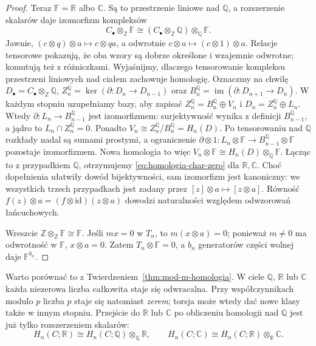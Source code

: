 \documentclass[11pt,a4paper,oneside]{report}
\newcommand{\R}{\mathbb{R}}
\newcommand{\C}{\mathbb{C}}
\newcommand{\Z}{\mathbb{Z}}
\newcommand{\Q}{\mathbb{Q}}
\newcommand{\id}{\mathrm{id}}
\theoremstyle{plain}
\theoremstyle{definition}
\theoremstyle{remark}
\begin{document}
\begin{proof}
Teraz $\mathbb F=\R$ albo $\C$.
Są to przestrzenie liniowe nad $\Q$, a
rozszerzenie skalarów daje izomorfizm
kompleksów
\[
 C_\bullet\otimes_{\Z}\mathbb F
 \cong (C_\bullet\otimes_{\Z}\Q)
             \otimes_{\Q}\mathbb F.
\]
Jawnie, $(c\otimes q)\otimes a\mapsto c\otimes qa$,
a odwrotnie $c\otimes a\mapsto(c\otimes1)\otimes a$.
Relacje tensorowe pokazują, że oba wzory są dobrze określone
i wzajemnie odwrotne; komutują też z różniczkami.
Wyjaśnijmy, dlaczego tensorowanie kompleksu
przestrzeni liniowych nad ciałem zachowuje
homologię. Oznaczmy na chwilę
$D_\bullet=C_\bullet\otimes_{\Z}\Q$,
$Z_n^\Q=\ker(\partial:D_n\to D_{n-1})$
oraz $B_n^\Q=\operatorname{im}(\partial:D_{n+1}\to D_n)$.
W każdym stopniu uzupełniamy bazy, aby zapisać
$Z_n^\Q=B_n^\Q\oplus V_n$ i
$D_n=Z_n^\Q\oplus L_n$.
Wtedy $\partial:L_n\to B_{n-1}^\Q$ jest
izomorfizmem: surjektywność wynika z definicji
$B_{n-1}^\Q$, a jądro to
$L_n\cap Z_n^\Q=0$. Ponadto
$V_n\cong Z_n^\Q/B_n^\Q=H_n(D)$.
Po tensorowaniu nad $\Q$ rozkłady nadal
są sumami prostymi, a ograniczenie
$\partial\otimes1:L_n\otimes\mathbb F
\to B_{n-1}^\Q\otimes\mathbb F$ pozostaje
izomorfizmem. Nowa homologia to więc
$V_n\otimes\mathbb F
\cong H_n(D)\otimes_{\Q}\mathbb F$.
Łącząc to z przypadkiem $\Q$, otrzymujemy
\eqref{eq:homologia-char-zero} dla $\R,\C$.
Choć dopełnienia ułatwiły dowód bijektywności, sam izomorfizm
jest kanoniczny: we wszystkich trzech przypadkach jest zadany
przez $[z]\otimes a\mapsto[z\otimes a]$.
Równość $f(z)\otimes a=(f\otimes\id)(z\otimes a)$ dowodzi
naturalności względem odwzorowań łańcuchowych.

Wreszcie $\Z\otimes_{\Z}\mathbb F\cong\mathbb F$.
Jeśli $mx=0$ w $T_n$, to
$m(x\otimes a)=0$; ponieważ $m\ne0$
ma odwrotność w $\mathbb F$,
$x\otimes a=0$. Zatem $T_n\otimes\mathbb F=0$,
a $b_n$ generatorów części wolnej daje
$\mathbb F^{b_n}$.
\end{proof}

Warto porównać to z Twierdzeniem~\ref{thm:mod-m-homologia}.
W ciele $\Q$, $\R$ lub $\C$ każda niezerowa
liczba całkowita staje się odwracalna.
Przy współczynnikach modulo $p$ liczba $p$
staje się natomiast \emph{zerem}; torsja
może wtedy dać nowe klasy także w innym stopniu.
Przejście do $\R$ lub $\C$ po obliczeniu
homologii nad $\Q$ jest już tylko
rozszerzeniem skalarów:
\[
 H_n(C;\R)\cong H_n(C;\Q)\otimes_{\Q}\R,
 \qquad
 H_n(C;\C)\cong H_n(C;\R)\otimes_{\R}\C.
\]
\end{document}
